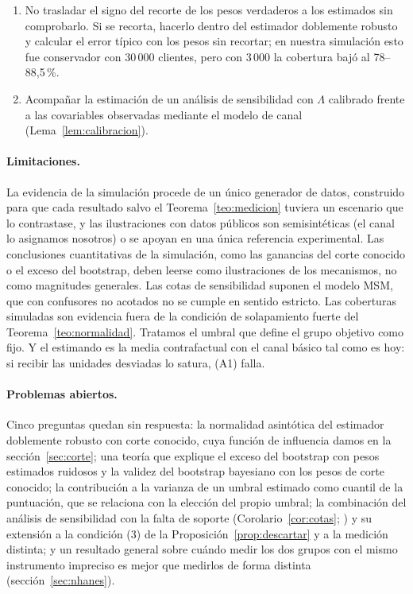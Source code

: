 \begin{enumerate}
  \item No trasladar el signo del recorte de los pesos verdaderos a los estimados sin comprobarlo. Si se recorta, hacerlo dentro del estimador doblemente robusto y calcular el error típico con los pesos sin recortar; en nuestra simulación esto fue conservador con 30\,000 clientes, pero con 3\,000 la cobertura bajó al 78--88,5\,\%.
  \item Acompañar la estimación de un análisis de sensibilidad con $\Lambda$ calibrado frente a las covariables observadas mediante el modelo de canal (Lema~\ref{lem:calibracion}).
\end{enumerate}

\paragraph{Limitaciones.} La evidencia de la simulación procede de un único generador de datos, construido para que cada resultado salvo el Teorema~\ref{teo:medicion} tuviera un escenario que lo contrastase, y las ilustraciones con datos públicos son semisintéticas (el canal lo asignamos nosotros) o se apoyan en una única referencia experimental. Las conclusiones cuantitativas de la simulación, como las ganancias del corte conocido o el exceso del bootstrap, deben leerse como ilustraciones de los mecanismos, no como magnitudes generales. Las cotas de sensibilidad suponen el modelo MSM, que con confusores no acotados no se cumple en sentido estricto. Las coberturas simuladas son evidencia fuera de la condición de solapamiento fuerte del Teorema~\ref{teo:normalidad}. Tratamos el umbral que define el grupo objetivo como fijo. Y el estimando es la media contrafactual con el canal básico tal como es hoy: si recibir las unidades desviadas lo satura, (A1) falla.

\paragraph{Problemas abiertos.} Cinco preguntas quedan sin respuesta: la normalidad asintótica del estimador doblemente robusto con corte conocido, cuya función de influencia damos en la sección~\ref{sec:corte}; una teoría que explique el exceso del bootstrap con pesos estimados ruidosos y la validez del bootstrap bayesiano con los pesos de corte conocido; la contribución a la varianza de un umbral estimado como cuantil de la puntuación, que se relaciona con la elección del propio umbral; la combinación del análisis de sensibilidad con la falta de soporte (Corolario~\ref{cor:cotas}; \citealp{manamkoong2025}) y su extensión a la condición (3) de la Proposición~\ref{prop:descartar} y a la medición distinta; y un resultado general sobre cuándo medir los dos grupos con el mismo instrumento impreciso es mejor que medirlos de forma distinta (sección~\ref{sec:nhanes}).

